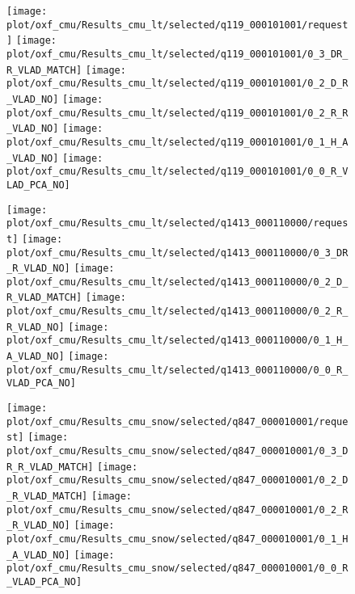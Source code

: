 \begin{figure}
	\begin{minipage}{0.02\textwidth}
	\end{minipage}\hfill
	\begin{minipage}{0.98\textwidth}
		\centering
		
		\texttt{[image: plot/oxf\_cmu/Results\_cmu\_lt/selected/q119\_000101001/request]}\hfill
		\texttt{[image: plot/oxf\_cmu/Results\_cmu\_lt/selected/q119\_000101001/0\_3\_DR\_R\_VLAD\_MATCH]}\hfill
		\texttt{[image: plot/oxf\_cmu/Results\_cmu\_lt/selected/q119\_000101001/0\_2\_D\_R\_VLAD\_NO]}\hfill	
		\texttt{[image: plot/oxf\_cmu/Results\_cmu\_lt/selected/q119\_000101001/0\_2\_R\_R\_VLAD\_NO]}\hfill	
		\texttt{[image: plot/oxf\_cmu/Results\_cmu\_lt/selected/q119\_000101001/0\_1\_H\_A\_VLAD\_NO]}\hfill	
		\texttt{[image: plot/oxf\_cmu/Results\_cmu\_lt/selected/q119\_000101001/0\_0\_R\_VLAD\_PCA\_NO]}
		
		\texttt{[image: plot/oxf\_cmu/Results\_cmu\_lt/selected/q1413\_000110000/request]}\hfill
		\texttt{[image: plot/oxf\_cmu/Results\_cmu\_lt/selected/q1413\_000110000/0\_3\_DR\_R\_VLAD\_NO]}\hfill
		\texttt{[image: plot/oxf\_cmu/Results\_cmu\_lt/selected/q1413\_000110000/0\_2\_D\_R\_VLAD\_MATCH]}\hfill
		\texttt{[image: plot/oxf\_cmu/Results\_cmu\_lt/selected/q1413\_000110000/0\_2\_R\_R\_VLAD\_NO]}\hfill
		\texttt{[image: plot/oxf\_cmu/Results\_cmu\_lt/selected/q1413\_000110000/0\_1\_H\_A\_VLAD\_NO]}\hfill
		\texttt{[image: plot/oxf\_cmu/Results\_cmu\_lt/selected/q1413\_000110000/0\_0\_R\_VLAD\_PCA\_NO]}
		
	\end{minipage}
	
	\begin{minipage}{0.02\textwidth}
	\end{minipage}\hfill
	\begin{minipage}{0.98\textwidth}
		\centering
		
		\texttt{[image: plot/oxf\_cmu/Results\_cmu\_snow/selected/q847\_000010001/request]}\hfill
		\texttt{[image: plot/oxf\_cmu/Results\_cmu\_snow/selected/q847\_000010001/0\_3\_DR\_R\_VLAD\_MATCH]}\hfill
		\texttt{[image: plot/oxf\_cmu/Results\_cmu\_snow/selected/q847\_000010001/0\_2\_D\_R\_VLAD\_MATCH]}\hfill	
		\texttt{[image: plot/oxf\_cmu/Results\_cmu\_snow/selected/q847\_000010001/0\_2\_R\_R\_VLAD\_NO]}\hfill	
		\texttt{[image: plot/oxf\_cmu/Results\_cmu\_snow/selected/q847\_000010001/0\_1\_H\_A\_VLAD\_NO]}\hfill	
		\texttt{[image: plot/oxf\_cmu/Results\_cmu\_snow/selected/q847\_000010001/0\_0\_R\_VLAD\_PCA\_NO]}
		

\end{minipage}
\end{figure}
